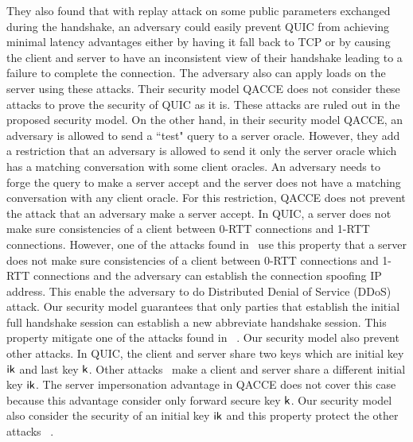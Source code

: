 They also found that with replay attack on some
public parameters exchanged during the handshake, an
adversary could easily prevent QUIC from achieving
minimal latency advantages either by having it fall back
to TCP or by causing the client and server to have an
inconsistent view of their handshake leading to a failure
to complete the connection.
The adversary also can apply loads on the server using
these attacks.
Their security model QACCE does not consider these attacks
to prove the security of QUIC as it is.
These attacks are ruled out in the proposed security model.
On the other hand, in their security model QACCE, an adversary
is allowed to send a ``test" query to a server oracle.
However, they add a restriction that an adversary is allowed
to send it only the server oracle which has a matching
conversation with some client oracles.
An adversary needs to forge the query to make a server accept
and the server does not have a matching conversation with any
client oracle.
For this restriction, QACCE does not prevent the attack that
an adversary make a server accept.
In QUIC, a server does not make sure consistencies of a client
between 0-RTT connections and 1-RTT connections.
However, one of the attacks found in~\cite{LJBN15:QUIC} use this
property that a server does not make sure consistencies of a client
between 0-RTT connections and 1-RTT connections and the adversary
can establish the connection spoofing IP address.
This enable the adversary to do Distributed Denial of Service
(DDoS) attack.
Our security model guarantees that only parties
that establish the initial full handshake session can
establish a new abbreviate handshake session.
This property mitigate one of the attacks found in
~\cite{LJBN15:QUIC}.
Our security model also prevent other attacks.
In QUIC, the client and server share two keys which are initial
key $\mathsf{ik}$ and last key $\mathsf{k}$.
Other attacks~\cite{LJBN15:QUIC} make a client and server share
a different initial key $\mathsf{ik}$.
The server impersonation advantage in QACCE does not
cover this case because this advantage consider only forward
secure key $\mathsf{k}$.
Our security model also consider the security of an initial
key $\mathsf{ik}$ and this property protect the other attacks
~\cite{LJBN15:QUIC}.

